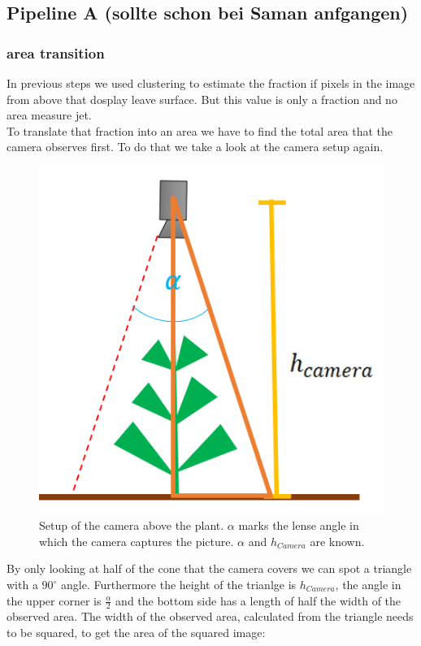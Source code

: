 \graphicspath{{members/tf/figures/}}

\subsection{Pipeline A (sollte schon bei Saman anfgangen)}

\subsubsection{area transition}
In previous steps we used clustering to estimate the fraction if pixels in the image from above that dosplay leave surface. But this value is only a fraction and no area measure jet.\\
To translate that fraction into an area we have to find the total area that the camera observes first. To do that we take a look at the camera setup again.
   \begin{figure}[H]
       \centering
       \includegraphics[scale=0.6]{setupAbove.PNG}
       \caption{Setup of the camera above the plant. $\alpha$ marks the lense angle in which the camera captures the picture. $\alpha$ and $h_{Camera}$ are known.}
       \label{fig:setupAbove}
   \end{figure}{}
By only looking at half of the cone that the camera covers we can spot a triangle with a $90^{\circ}$ angle. Furthermore the height of the trianlge is $h_{Camera}$, the angle in the upper corner is $\frac{\alpha}{2}$ and the bottom side has a length of half the width of the observed area. The width of the observed area, calculated from the triangle needs to be squared, to get the area of the squared image:\\
